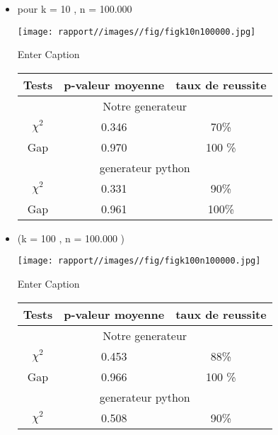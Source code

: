 \begin{itemize}
     
    \item pour  k = 10 , n = 100.000
        \begin{center}

            \texttt{[image: rapport//images//fig/figk10n100000.jpg]}
            \caption{Enter Caption}
            \label{fig:enter-label}
   
            \begin{tabular}{c|c|c}
                \hline
                Tests & p-valeur moyenne & taux de reussite \\
                \hline
                    \multicolumn{3}{c}{Notre generateur} \\
                \hline
                $\chi^2$ & 0.346  & 70\% \\
                
                Gap & 0.970 &  100 \%\\
                \hline
                 \multicolumn{3}{c}{generateur python} \\
                \hline
                $\chi^2$ & 0.331 & 90\% \\
                
                Gap & 0.961 & 100\%\\
                \hline
            \end{tabular}
        \end{center}
        
    \item  (k = 100 , n = 100.000 ) 
         \begin{center}
    
            \texttt{[image: rapport//images//fig/figk100n100000.jpg]}
            \caption{Enter Caption}
            \label{fig:enter-label}
               
            \begin{tabular}{c|c|c}
                \hline
                Tests & p-valeur moyenne & taux de reussite \\
                \hline
                    \multicolumn{3}{c}{Notre generateur} \\
                \hline
                $\chi^2$ & 0.453  & 88\% \\
                
                Gap & 0.966 &  100 \%\\
                \hline
                 \multicolumn{3}{c}{generateur python} \\
                \hline
                $\chi^2$ & 0.508 & 90\% \\
                

\end{tabular}
\end{center}
\end{itemize}
